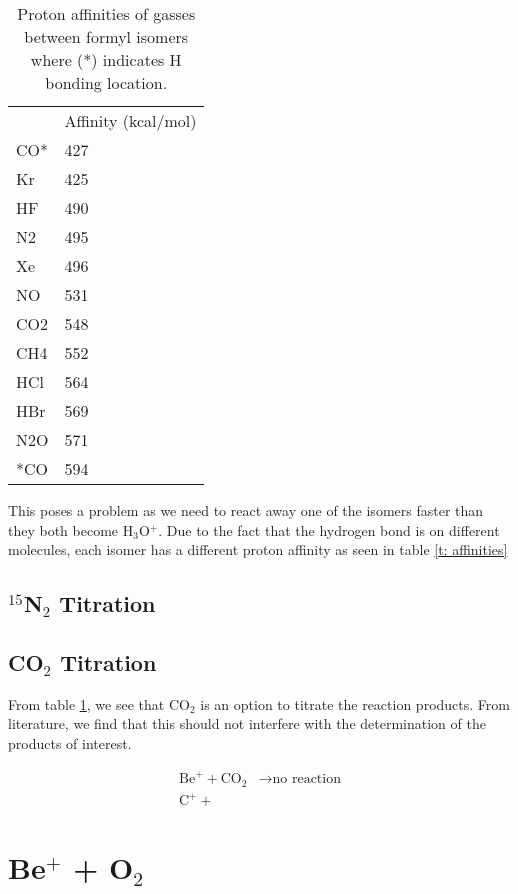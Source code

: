 \begin{table}[H]
\centering
\label{t: affinities}
\begin{tabular}{ll}
    & Affinity (kcal/mol) \\
CO* & 427               \\
Kr  & 425               \\
HF  & 490               \\
N2  & 495               \\
Xe  & 496               \\
NO  & 531               \\
CO2 & 548               \\
CH4 & 552               \\
HCl & 564               \\
HBr & 569               \\
N2O & 571              \\
*CO & 594
\end{tabular}
\caption{Proton affinities of gasses between formyl isomers where (*) indicates H bonding location.} \label{tab: affinity}
\end{table}

This poses a problem as we need to react away one of the isomers faster than they both become H$_3$O$^+$. Due to the fact that the hydrogen bond is on different molecules, each isomer has a different proton affinity as seen in table \ref{t: affinities} \cite{Love1987TheAffinity}

\subsection{$^{15}$N$_2$ Titration}

\subsection{CO$_2$ Titration}

From table \ref{tab: affinity}, we see that CO$_2$ is an option to titrate the reaction products. From literature, we find that this should not interfere with the determination of the products of interest.

\begin{align}
	\text{Be}^+ + \text{CO}_2 & \rightarrow \text{no reaction} \\
	\text{C}^+ + 
\end{align}

\section{Be$^+$ + O$_2$}

